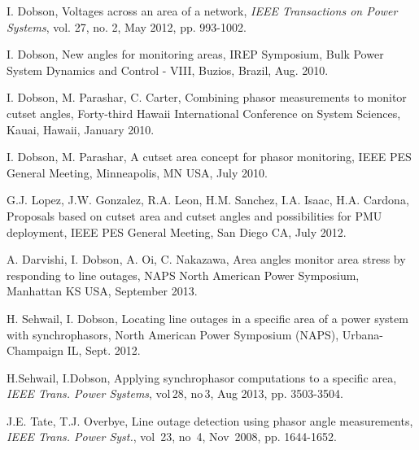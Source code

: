 \documentclass[conference]{IEEEtran}
\begin{document}
  \begin{thebibliography}{9}
  
  \vspace{2pt}



  I. Dobson,  Voltages across an area of a network, {\sl IEEE Transactions on Power Systems}, vol. 27, no. 2, May 2012, pp. 993-1002. 


   I. Dobson, New angles for monitoring areas, IREP Symposium,
Bulk Power System Dynamics and Control - VIII, Buzios,  Brazil, Aug. 2010.


  I. Dobson, M. Parashar, C. Carter, Combining phasor measurements to monitor cutset angles,  
Forty-third Hawaii International Conference on System Sciences, Kauai, Hawaii, January 2010.

  I. Dobson, M. Parashar, A cutset area concept for phasor monitoring, 
IEEE PES General Meeting, Minneapolis, MN USA, July 2010.

 G.J. Lopez, J.W. Gonzalez, R.A. Leon, H.M. Sanchez, I.A. Isaac, H.A. Cardona, Proposals based on cutset area and cutset angles and possibilities for PMU deployment,
IEEE PES General Meeting, San Diego CA, July 2012.


 A. Darvishi, I. Dobson, A. Oi, C. Nakazawa,
Area angles monitor area stress by responding to line outages,
 NAPS North American Power Symposium, Manhattan KS USA, September 2013.


	 H. Sehwail, I. Dobson, Locating line outages in a specific area of a power system with synchrophasors, North American Power Symposium (NAPS), Urbana-Champaign IL, Sept. 2012. 

 	 H.Sehwail, I.Dobson, Applying
synchrophasor computations to a specific area,
{\sl IEEE Trans. Power Systems}, vol\,28, no\,3, Aug 2013, pp. 3503-3504.

 J.E. Tate, T.J. Overbye,
Line outage detection using phasor angle measurements,
{\sl IEEE Trans. Power Syst.}, vol~23, no~4, Nov~2008, pp. 1644-1652.


\end{thebibliography}
\end{document}
